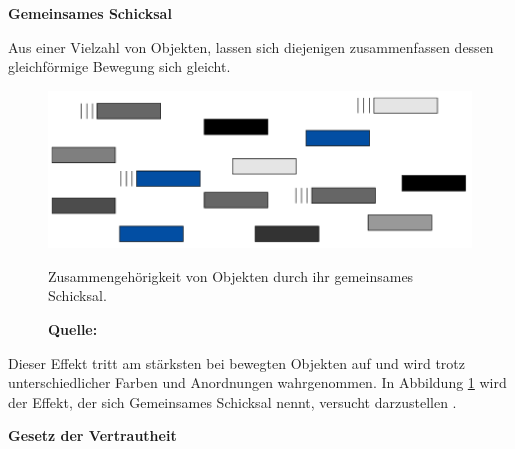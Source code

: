 \textbf{Gemeinsames Schicksal}

Aus einer Vielzahl von Objekten, lassen sich diejenigen zusammenfassen dessen gleichförmige Bewegung sich gleicht.
\begin{figure}[H]
  \centering
  \includegraphics[scale=1]{img/gesetz_des_gemeinsamen_Schicksals.PNG}
  \caption{Zusammengehörigkeit von Objekten durch ihr gemeinsames Schicksal.}
    \caption*{\textbf{Quelle:} \citep{Dahm2006}}
  \label{fig:gemeinsamesSchicksal}
\end{figure}
Dieser Effekt tritt am stärksten bei bewegten Objekten auf und wird trotz unterschiedlicher Farben und Anordnungen wahrgenommen. In Abbildung \ref{fig:gemeinsamesSchicksal} wird der Effekt, der sich \glqq Gemeinsames Schicksal\grqq{} nennt, versucht darzustellen \citep[vgl.][62]{Dahm2006}.

\textbf{Gesetz der Vertrautheit}

